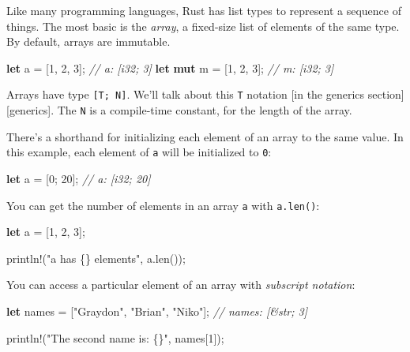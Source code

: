 \documentclass[a4paper,]{book}
\newenvironment{Shaded}{\begin{snugshade}}{\end{snugshade}}
\newcommand{\KeywordTok}[1]{\textcolor[rgb]{0.13,0.29,0.53}{\textbf{{#1}}}}
\newcommand{\DecValTok}[1]{\textcolor[rgb]{0.00,0.00,0.81}{{#1}}}
\newcommand{\StringTok}[1]{\textcolor[rgb]{0.31,0.60,0.02}{{#1}}}
\newcommand{\CommentTok}[1]{\textcolor[rgb]{0.56,0.35,0.01}{\textit{{#1}}}}
\newcommand{\OtherTok}[1]{\textcolor[rgb]{0.56,0.35,0.01}{{#1}}}
\newcommand{\NormalTok}[1]{{#1}}
\begin{document}
Like many programming languages, Rust has list types to represent a
sequence of things. The most basic is the \emph{array}, a fixed-size
list of elements of the same type. By default, arrays are immutable.

\begin{Shaded}
\begin{Highlighting}[]
\KeywordTok{let} \NormalTok{a = [}\DecValTok{1}\NormalTok{, }\DecValTok{2}\NormalTok{, }\DecValTok{3}\NormalTok{]; }\CommentTok{// a: [i32; 3]}
\KeywordTok{let} \KeywordTok{mut} \NormalTok{m = [}\DecValTok{1}\NormalTok{, }\DecValTok{2}\NormalTok{, }\DecValTok{3}\NormalTok{]; }\CommentTok{// m: [i32; 3]}
\end{Highlighting}
\end{Shaded}

Arrays have type \texttt{{[}T;\ N{]}}. We'll talk about this \texttt{T}
notation {[}in the generics section{]}{[}generics{]}. The \texttt{N} is
a compile-time constant, for the length of the array.

There's a shorthand for initializing each element of an array to the
same value. In this example, each element of \texttt{a} will be
initialized to \texttt{0}:

\begin{Shaded}
\begin{Highlighting}[]
\KeywordTok{let} \NormalTok{a = [}\DecValTok{0}\NormalTok{; }\DecValTok{20}\NormalTok{]; }\CommentTok{// a: [i32; 20]}
\end{Highlighting}
\end{Shaded}

You can get the number of elements in an array \texttt{a} with
\texttt{a.len()}:

\begin{Shaded}
\begin{Highlighting}[]
\KeywordTok{let} \NormalTok{a = [}\DecValTok{1}\NormalTok{, }\DecValTok{2}\NormalTok{, }\DecValTok{3}\NormalTok{];}

\OtherTok{println!}\NormalTok{(}\StringTok{"a has \{\} elements"}\NormalTok{, a.len());}
\end{Highlighting}
\end{Shaded}

You can access a particular element of an array with \emph{subscript
notation}:

\begin{Shaded}
\begin{Highlighting}[]
\KeywordTok{let} \NormalTok{names = [}\StringTok{"Graydon"}\NormalTok{, }\StringTok{"Brian"}\NormalTok{, }\StringTok{"Niko"}\NormalTok{]; }\CommentTok{// names: [&str; 3]}

\OtherTok{println!}\NormalTok{(}\StringTok{"The second name is: \{\}"}\NormalTok{, names[}\DecValTok{1}\NormalTok{]);}
\end{Highlighting}
\end{Shaded}
\end{document}
